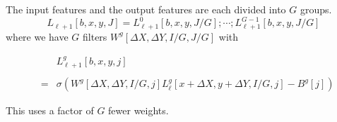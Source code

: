 {

The input features and the output features are each divided into $G$ groups.
$$L_{\ell+1}[b,x,y,J] = L^0_{\ell+1}[b,x,y,J/G];\cdots;L^{G-1}_{\ell+1}[b,x,y,J/G]$$
where we have $G$ filters $W^g[\Delta X, \Delta Y,I/G,J/G]$ with

\begin{eqnarray*}
 & & L^g_{{\ell+1}}[b,x,y,j] \\
 \\
 & = & \sigma(W^g[\Delta X, \Delta Y,I/G,j]L_\ell^g[x+\Delta X,y+\Delta Y,I/G,j] - B^g[j])
 \end{eqnarray*}

\vfill
This uses a factor of $G$ fewer weights.

}

